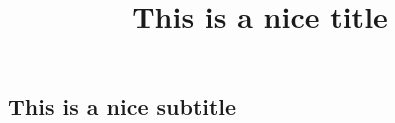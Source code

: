 \documentclass[12pt]{article}
\author{\memberOne{,}\memberTwo{,} \memberThree{,} \memberFour{,}}
\title{This is a nice title}
\newcommand{\subtitle}{This is a nice subtitle}
\begin{document}
\section*{\thetitle}
\subsection*{\subtitle}
\end{document}

